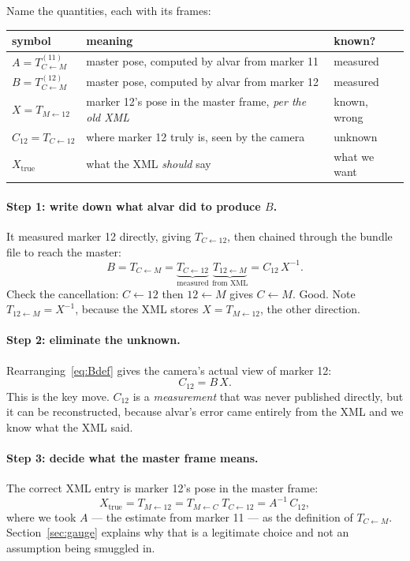 \documentclass[11pt,a4paper]{article}
\newcommand{\T}[2]{T_{#1 \leftarrow #2}}   %
\begin{document}
Name the quantities, each with its frames:

\begin{center}
\begin{tabular}{lll}
\toprule
symbol & meaning & known? \\
\midrule
$A = \T{C}{M}^{(11)}$ & master pose, computed by alvar from marker 11 & measured \\
$B = \T{C}{M}^{(12)}$ & master pose, computed by alvar from marker 12 & measured \\
$X = \T{M}{12}$       & marker 12's pose in the master frame, \emph{per the old XML} & known, wrong \\
$C_{12} = \T{C}{12}$  & where marker 12 truly is, seen by the camera & unknown \\
$X_{\text{true}}$     & what the XML \emph{should} say & what we want \\
\bottomrule
\end{tabular}
\end{center}

\paragraph{Step 1: write down what alvar did to produce $B$.}
It measured marker 12 directly, giving $\T{C}{12}$, then chained through the bundle file
to reach the master:
\begin{equation}
  B = \T{C}{M} = \underbrace{\T{C}{12}}_{\text{measured}} \; \underbrace{\T{12}{M}}_{\text{from XML}}
    = C_{12} \, X^{-1}.
  \label{eq:Bdef}
\end{equation}
Check the cancellation: $C \leftarrow 12$ then $12 \leftarrow M$ gives $C \leftarrow M$. Good.
Note $\T{12}{M} = X^{-1}$, because the XML stores $X = \T{M}{12}$, the other direction.

\paragraph{Step 2: eliminate the unknown.}
Rearranging~\eqref{eq:Bdef} gives the camera's actual view of marker 12:
\begin{equation}
  C_{12} = B\,X.
  \label{eq:C12}
\end{equation}
This is the key move. $C_{12}$ is a \emph{measurement} that was never published directly,
but it can be reconstructed, because alvar's error came entirely from the XML and we
know what the XML said.

\paragraph{Step 3: decide what the master frame means.}
The correct XML entry is marker 12's pose in the master frame:
\begin{equation}
  X_{\text{true}} = \T{M}{12} = \T{M}{C}\;\T{C}{12} = A^{-1}\,C_{12},
\end{equation}
where we took $A$ --- the estimate from marker 11 --- as the definition of $\T{C}{M}$.
Section~\ref{sec:gauge} explains why that is a legitimate choice and not an assumption
being smuggled in.
\end{document}
